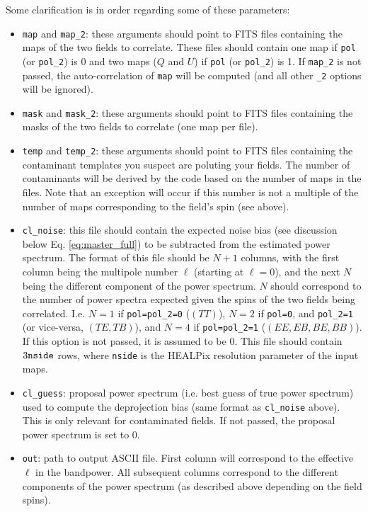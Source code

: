 \documentclass[a4paper,10pt]{article}
\begin{document}
Some clarification is in order regarding some of these parameters:
\begin{itemize}
 \item {\tt map} and {\tt map\_2}: these arguments should point to FITS files containing the maps of the two fields to correlate. These files should contain one map if {\tt pol} (or {\tt pol\_2}) is 0 and two maps ($Q$ and $U$) if {\tt pol} (or {\tt pol\_2}) is 1. If {\tt map\_2} is not passed, the auto-correlation of {\tt map} will be computed (and all other {\tt \_2} options will be ignored).
 \item {\tt mask} and {\tt mask\_2}: these arguments should point to FITS files containing the masks of the two fields to correlate (one map per file).
 \item {\tt temp} and {\tt temp\_2}: these arguments should point to FITS files containing the contaminant templates you suspect are poluting your fields. The number of contaminants will be derived by the code based on the number of maps in the files. Note that an exception will occur if this number is not a multiple of the number of maps corresponding to the field's spin (see above).
 \item {\tt cl\_noise}: this file should contain the expected noise bias (see discussion below Eq. \ref{eq:master_full}) to be subtracted from the estimated power spectrum. The format of this file should be $N+1$ columns, with the first column being the multipole number $\ell$ (starting at $\ell=0$), and the next $N$ being the different component of the power spectrum. $N$ should correspond to the number of power spectra expected given the spins of the two fields being correlated. I.e. $N=1$ if {\tt pol=pol\_2=0} ($(TT)$), $N=2$ if {\tt pol=0}, and {\tt pol\_2=1} (or vice-versa, $(TE,TB)$), and $N=4$ if {\tt pol=pol\_2=1} ($(EE,EB,BE,BB)$). If this option is not passed, it is assumed to be $0$. This file should contain $3{\tt nside}$ rows, where {\tt nside} is the HEALPix resolution parameter of the input maps.
 \item {\tt cl\_guess}: proposal power spectrum (i.e. best guess of true power spectrum) used to compute the deprojection bias (same format as {\tt cl\_noise} above). This is only relevant for contaminated fields. If not passed, the proposal power spectrum is set to $0$.
 \item {\tt out}: path to output ASCII file. First column will correspond to the effective $\ell$ in the bandpower. All subsequent columns correspond to the different components of the power spectrum (as described above depending on the field spins).

\end{itemize}
\end{document}
